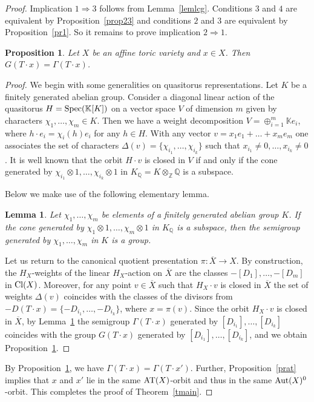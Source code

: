 \documentclass[12pt,a4paper]{amsart}
\theoremstyle{plain}
\newtheorem{lemma}{Lemma}
\newtheorem{proposition}{Proposition}
\theoremstyle{definition}
\begin{document}
\begin{proof}
Implication $1 \Rightarrow 3$ follows from Lemma~\ref{lemlcg}.
Conditions $3$ and $4$ are equivalent by Proposition~\ref{prop23}
and conditions $2$ and $3$ are equivalent by Proposition~\ref{pr1}.
So it remains to prove implication $2 \Rightarrow 1$.

\begin{proposition} \label{pr2}
Let $X$ be an affine toric variety and $x\in X$. Then $G(T\cdot x) = \Gamma(T\cdot x)$.
\end{proposition}

\begin{proof}
We begin with some generalities on quasitorus representations.
Let $K$ be a finitely generated abelian group.
Consider a diagonal linear action of the quasitorus $H={\mathop{\rm Spec}}({{\mathbb K}}[K])$ on a vector space
$V$ of dimension $m$ given by characters $\chi_1,\ldots,\chi_m\in K$. Then we have a weight
decomposition $V=\oplus_{i=1}^m {{\mathbb K}} e_i$, where $h\cdot e_i=\chi_i(h)e_i$ for any $h\in H$.
With any vector $v=x_1e_1+\ldots+x_me_m$ one associates the set of characters
$\Delta(v)=\{\chi_{i_1},\ldots,\chi_{i_k}\}$ such that $x_{i_1}\ne 0,\ldots,x_{i_k}\ne 0$.
It is well known that the orbit $H\cdot v$ is closed in $V$ if and only if
the cone generated by $\chi_{i_1}\otimes 1,\ldots,\chi_{i_k}\otimes 1$
in $K_{{\mathbb Q}}=K\otimes_{{\mathbb Z}}{{\mathbb Q}}$ is a subspace.

\smallskip

Below we make use of the following elementary lemma.

\begin{lemma} \label{Lemel}
Let $\chi_1,\dots,\chi_m$ be elements of a finitely generated abelian group $K$.
If the cone generated by $\chi_1\otimes 1,\dots,\chi_m\otimes 1$ in
$K_{{\mathbb Q}}$ is a subspace, then the semigroup generated
by $\chi_1,\dots,\chi_m$ in $K$ is a group.
\end{lemma}

Let us return to the canonical quotient presentation $\pi:\overline{X}\to X$.
By construction, the $H_X$-weights of the linear $H_X$-action on $\overline{X}$
are the classes $-[D_1],\ldots,-[D_m]$ in ${\mathop{\rm Cl}}(X)$. Moreover,
for any point $v\in\overline{X}$ such that $H_X\cdot v$ is closed in $\overline{X}$
the set of weights $\Delta(v)$ coincides with the classes
of the divisors from $-D(T\cdot x)=\{-D_{i_1},\ldots,-D_{i_k}\}$, where $x=\pi(v)$.
Since the orbit $H_X\cdot v$ is closed in $\overline{X}$, by Lemma~\ref{Lemel}
the semigroup $\Gamma(T\cdot x)$ generated by $[D_{i_1}],\ldots,[D_{i_k}]$ coincides
with the group $G(T\cdot x)$ generated by $[D_{i_1}],\ldots,[D_{i_k}]$, and we
obtain Proposition~\ref{pr2}.
\end{proof}

By Proposition~\ref{pr2}, we have $\Gamma(T\cdot x)=\Gamma(T\cdot x')$.
Further, Proposition~\ref{prat} implies that $x$ and $x'$ lie in the same
${\mathop{\rm AT}}(X)$-orbit and thus in the same ${\mathop{\rm Aut}}(X)^0$-orbit. This completes
the proof of Theorem~\ref{tmain}.
\end{proof}
\end{document}
